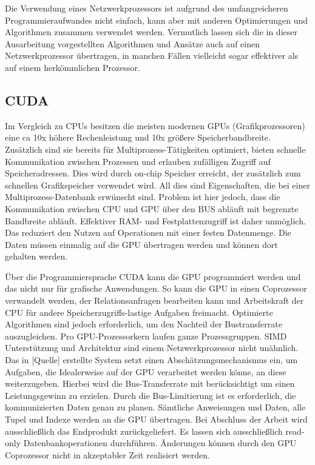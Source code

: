 Die Verwendung eines Netzwerkprozessors ist aufgrund des umfangreicheren Programmieraufwandes nicht einfach, kann aber mit anderen Optimierungen und Algorithmen zusammen verwendet werden. Vermutlich lassen sich die in dieser Ausarbeitung vorgestellten Algorithmen und Ansätze auch auf einen Netzwerkprozessor übertragen, in manchen Fällen vielleicht sogar effektiver als auf einem herkömmlichen Prozessor.


\subsection{CUDA}
\label{sec:CUDA}

Im Vergleich zu CPUs besitzen die meisten modernen GPUs (Grafikprozessoren) eine ca 10x höhere Rechenleistung und 10x größere Speicherbandbreite. Zusätzlich sind sie bereits für Multiprozess-Tätigkeiten optimiert, bieten schnelle Kommunikation zwischen Prozessen und erlauben zufälligen Zugriff auf Speicheradressen. Dies wird durch on-chip Speicher erreicht, der zusätzlich zum schnellen Grafikspeicher verwendet wird. All dies sind Eigenschaften, die bei einer Multiprozess-Datenbank erwünscht sind. Problem ist hier jedoch, dass die Kommunikation zwischen CPU und GPU über den BUS abläuft mit begrenzte Bandbreite abläuft. Effektiver RAM- und Festplattenzugriff ist daher unmöglich. Das reduziert den Nutzen auf Operationen mit einer festen Datenmenge. Die Daten müssen einmalig auf die GPU übertragen werden und können dort gehalten werden.

Über die Programmiersprache CUDA kann die GPU programmiert werden und das nicht nur für grafische Anwendungen. So kann die GPU in einen Coprozessor verwandelt werden, der Relationsanfragen bearbeiten kann und Arbeitskraft der CPU für andere Speicherzugriffs-lastige Aufgaben freimacht. \cite{HE} Optimierte Algorithmen sind jedoch erforderlich, um den Nachteil der Bustransferrate auszugleichen. Pro GPU-Prozessorkern laufen ganze Prozessgruppen. SIMD Unterstützung und Architektur sind einem Netzwerkprozessor nicht unähnlich. Das in [Quelle] erstellte System setzt einen Abschätzungsmechanismus ein, um Aufgaben, die Idealerweise auf der GPU verarbeitet werden könne, an diese weiterzugeben. Hierbei wird die Bus-Transferrate mit berücksichtigt um einen Leistungsgewinn zu erzielen. Durch die Bus-Limitierung ist es erforderlich, die kommunizierten Daten genau zu planen. Sämtliche Anweisungen und Daten, alle Tupel und Indexe werden an die GPU übertragen. Bei Abschluss der Arbeit wird ausschließlich das Endprodukt zurückgeliefert. Es lassen sich ausschließlich read-only Datenbankoperationen durchführen. Änderungen können durch den GPU Coprozessor nicht in akzeptabler Zeit realisiert werden.

